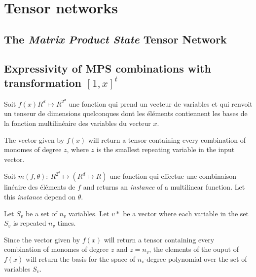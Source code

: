 \documentclass[11pt]{article}
\begin{document}
\section{Tensor networks}

\subsection{The \textit{Matrix Product State} Tensor Network}
\subsection{Expressivity of MPS combinations with transformation $[1,x]^t$}
Soit $f(x) R^d \mapsto R^{2^d}$ une fonction qui prend un 
vecteur de variables et qui renvoit un tenseur de dimensions quelconques
dont les éléments contiennent les bases de la fonction multilinéaire des
variables du vecteur $x$. 

The vector given by $f(x)$ will return a tensor containing
every combination of monomes of degree $z$, where $z$ is the smallest
repeating variable in the input vector.

Soit $m(f, \theta): \ R^{2^d} \mapsto (R^d \mapsto R)$ une fonction qui effectue une 
combinaison linéaire des éléments de $f$ and returns an \textit{instance} of
a multilinear function. Let this \textit{instance} depend on $\theta$. 

Let $S_v$ be a set of $n_v$ variables.
Let $v*$ be a vector where each variable in the set $S_v$ is repeated $n_v$ times. 

Since the vector given by $f(x)$ will return a tensor containing
every combination of monomes of degree $z$ and $z = n_v$, the elements
of the ouput of $f(x)$ will return the basis for the space 
of $n_v$-degree polynomial over the set of variables $S_v$. 
\end{document}
